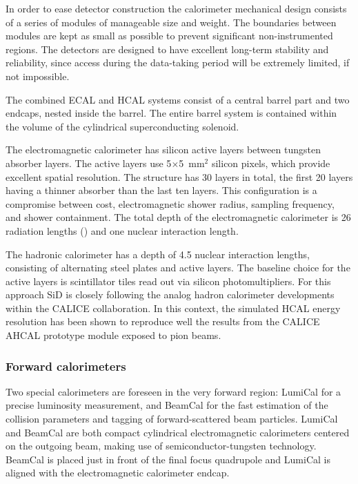 In order to ease detector construction the calorimeter mechanical design consists of a series of modules of
manageable size and weight. The boundaries between
modules are kept as small as possible to prevent significant non-instrumented
regions. The detectors are designed to have excellent long-term stability and reliability,
since access during the data-taking period will be extremely limited, if not
impossible.

The combined ECAL and HCAL systems consist of a
central barrel part and two endcaps, nested inside the barrel. The entire barrel system is contained
within the volume of the cylindrical superconducting solenoid. 

The
electromagnetic calorimeter has silicon active layers between tungsten absorber
layers. The active layers use 5$\times$5~mm$^2$ silicon pixels, which provide excellent spatial resolution.
The structure has 30 layers in total, the first 20 layers having a
thinner absorber than the last ten layers. This configuration is a 
compromise between cost, electromagnetic shower radius, sampling frequency, and
shower containment. The total depth of the electromagnetic calorimeter is 26
radiation lengths (\xo) and one nuclear interaction length. 

The hadronic
calorimeter has a depth of 4.5 nuclear interaction lengths, consisting of
alternating steel plates and active layers. The baseline choice for the active
layers is scintillator tiles read out via silicon photomultipliers. For this approach SiD is closely following the analog hadron calorimeter developments within the CALICE collaboration. In this context, the simulated HCAL energy resolution has been shown to reproduce well the results from the CALICE AHCAL prototype module exposed to pion beams.

\subsubsection{Forward calorimeters}

Two special calorimeters are foreseen in the very forward region: LumiCal for a precise luminosity measurement, and BeamCal for the fast estimation of the collision parameters and tagging of forward-scattered beam particles. LumiCal and BeamCal are both compact cylindrical electromagnetic calorimeters centered on the outgoing beam, making use of semiconductor-tungsten technology. BeamCal is placed just in front of the final focus quadrupole and LumiCal is aligned with the electromagnetic calorimeter endcap. 

